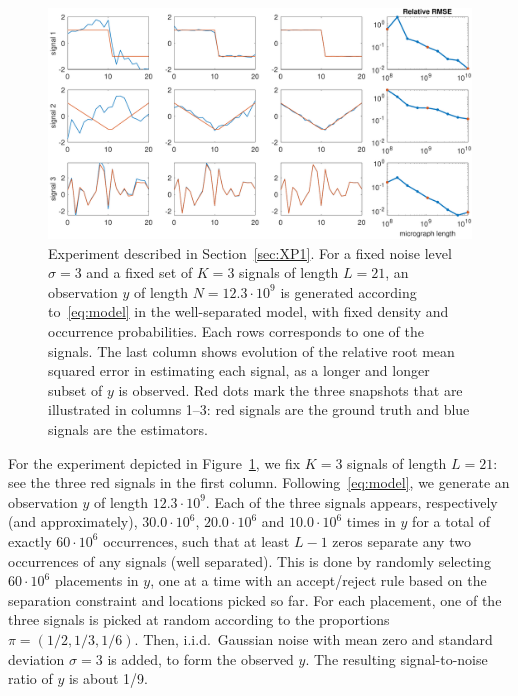 \documentclass[12pt]{article}
\newcommand{\1}{\mathbf{1}}
\theoremstyle{plain}
\theoremstyle{definition}
\theoremstyle{remark}
\theoremstyle{plain}
\theoremstyle{remark}
\theoremstyle{plain}
\theoremstyle{plain}
\theoremstyle{plain}
\numberwithin{equation}{section}
\begin{document}
\begin{figure}[t]
	\centering
	\includegraphics[width=1\linewidth]{heterogeneous_progressive_n12300000000_466300}
	\caption{Experiment described in Section~\ref{sec:XP1}. For a fixed noise level $\sigma = 3$ and a fixed set of $K = 3$ signals of length $L = 21$, an observation $y$ of length $N = 12.3 \cdot 10^9$ is generated according to~\eqref{eq:model} in the well-separated model, with fixed density and occurrence probabilities. Each rows corresponds to one of the signals. The last column shows evolution of the relative root mean squared error in estimating each signal, as a longer and longer subset of $y$ is observed. Red dots mark the three snapshots that are illustrated in columns 1--3: red signals are the ground truth and blue signals are the estimators.}
	\label{fig:1Dheterosignals}
\end{figure}

For the experiment depicted in Figure~\ref{fig:1Dheterosignals}, we fix $K = 3$ signals of length $L = 21$: see the three red signals in the first column. Following~\eqref{eq:model}, we generate an observation $y$ of length $12.3 \cdot 10^9$. Each of the three signals appears, respectively (and approximately), $30.0 \cdot 10^6$, $20.0 \cdot 10^6$ and $10.0 \cdot 10^6$ times in $y$ for a total of exactly $60 \cdot 10^6$ occurrences, such that at least $L-1$ zeros separate any two occurrences of any signals (well separated). This is done by randomly selecting $60 \cdot 10^6$ placements in $y$, one at a time with an accept/reject rule based on the separation constraint and locations picked so far. For each placement, one of the three signals is picked at random according to the proportions $\pi = (1/2, 1/3, 1/6)$. Then, i.i.d.\ Gaussian noise with mean zero and standard deviation $\sigma = 3$ is added, to form the observed $y$. The resulting signal-to-noise ratio of $y$
is about 1/9.
\end{document}
